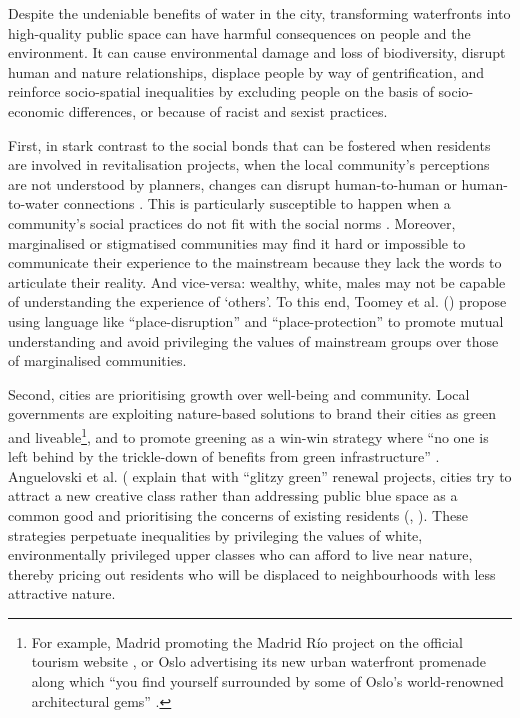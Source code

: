 \documentclass{article}
\begin{document}
Despite the undeniable benefits of water in the city, transforming waterfronts into high-quality public space can have harmful consequences on people and the environment. It can cause environmental damage and loss of biodiversity, disrupt human and nature relationships, displace people by way of gentrification, and reinforce socio-spatial inequalities by excluding people on the basis of socio-economic differences, or because of racist and sexist practices. 

First, in stark contrast to the social bonds that can be fostered when residents are involved in revitalisation projects, when the local community’s perceptions are not understood by planners, changes can disrupt human-to-human or human-to-water connections \parencite{toomey2021place}. This is particularly susceptible to happen when a community's social practices do not fit with the social norms \parencite{wessells2014urban}. 
Moreover, marginalised or stigmatised communities may find it hard or impossible to communicate their experience to the mainstream because they lack the words to articulate their reality. And vice-versa: wealthy, white, males may not be capable of understanding the experience of `others'. To this end, Toomey et al. (\citeyear{toomey2021place}) propose using language like ``place-disruption'' and ``place-protection'' to promote mutual understanding and avoid privileging the values of mainstream groups over those of marginalised communities.

Second, cities are prioritising growth over well-being and community. Local governments are exploiting nature-based solutions to brand their cities as green and liveable\footnote{For example, Madrid promoting the Madrid Río project on the official tourism website \parencite{madridrio}, or Oslo advertising its new urban waterfront promenade along which ``you find yourself surrounded by some of Oslo's world-renowned architectural gems'' \parencite{visitoslo}.}, and to promote greening as a win-win strategy where ``no one is left behind by the trickle-down of benefits from green infrastructure'' \parencite{anguelovski2021green}.
Anguelovski et al. (\citeyear{anguelovski2021green} explain that with ``glitzy green'' renewal projects, cities try to attract a new creative class rather than addressing public blue space as a common good and prioritising the concerns of existing residents (\cite{wessells2014urban}, \cite{anguelovski2020expanding}).
These strategies perpetuate inequalities by privileging the values of white, environmentally privileged upper classes who can afford to live near nature, thereby pricing out residents who will be displaced to neighbourhoods with less attractive nature.
\end{document}
